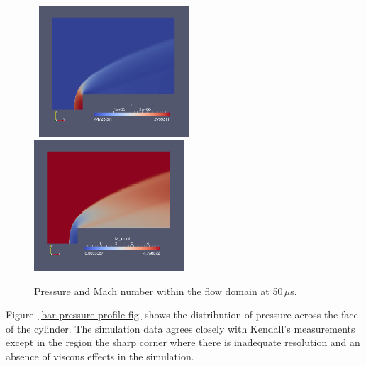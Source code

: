 \begin{figure}[htbp]
\mbox{
\includegraphics[width=0.5\textwidth]{../2D/bar-476/bar-p-field.png}
\includegraphics[width=0.5\textwidth]{../2D/bar-476/bar-Mach-field.png}
}
\caption{Pressure and Mach number within the flow domain at 50\,$\mu$s.}
\label{bar-pressure-mach-fig}
\end{figure}

Figure~\ref{bar-pressure-profile-fig} shows the distribution of pressure
across the face of the cylinder.  
The simulation data agrees closely with Kendall's measurements 
except in the region the sharp corner where there is inadequate resolution
and an absence of viscous effects in the simulation.

